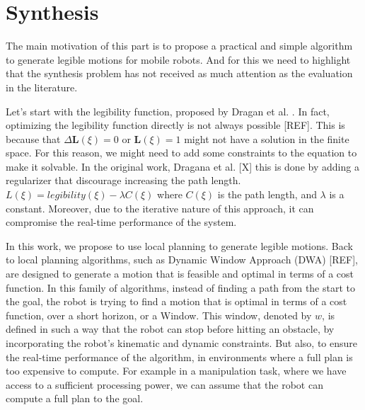 
\section{Synthesis}

The main motivation of this part is to propose a practical and simple algorithm to generate legible motions for mobile robots.
And for this we need to highlight that the synthesis problem has not received as much attention as the evaluation in the literature.

Let's start with the legibility function, proposed by Dragan et al. \cite{dragan2013legibility}. 
In fact, optimizing the legibility function directly is not always possible [REF].
This is because that $\Delta \mathbf{L}(\xi) = 0$ or $\mathbf{L}(\xi) = 1$ might not have a solution in the finite space.
For this reason, we might need to add some constraints to the equation to make it solvable.
In the original work, Dragana et al. [X] this is done by adding a regularizer that discourage increasing the path length.
$L(\xi) = legibility(\xi) - \lambda C(\xi)$
where $C(\xi)$ is the path length, and $\lambda$ is a constant.
Moreover, due to the iterative nature of this approach, it can compromise the real-time performance of the system.


In this work, we propose to use local planning to generate legible motions.
Back to local planning algorithms, such as Dynamic Window Approach (DWA) [REF], are designed to generate a motion that is feasible and optimal in terms of a cost function.
%
In this family of algorithms, instead of finding a path from the start to the goal,
the robot is trying to find a motion that is optimal in terms of a cost function, over a short horizon, or a Window.
This window, denoted by $w$, is defined in such a way that the robot can stop before hitting an obstacle,
by incorporating the robot's kinematic and dynamic constraints.
But also, to ensure the real-time performance of the algorithm, in environments where a full plan is too expensive to compute.
For example in a manipulation task, where we have access to a sufficient processing power,
we can assume that the robot can compute a full plan to the goal.

